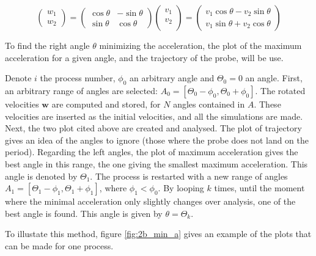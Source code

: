 \documentclass[a4paper,12pt,twoside]{article}
\begin{document}
\begin{equation}
  \begin{pmatrix}
    w_1 \\
    w_2
  \end{pmatrix}
  =
  \begin{pmatrix}
    \cos\theta & -\sin\theta \\
    \sin\theta & \cos\theta
  \end{pmatrix}
  \begin{pmatrix}
    v_1 \\
    v_2 \\
  \end{pmatrix}
  =
  \begin{pmatrix}
    v_1\cos\theta - v_2\sin\theta \\
    v_1\sin\theta + v_2\cos\theta
  \end{pmatrix}
  \label{eq:v_rotation}
\end{equation}

To find the right angle $\theta$ minimizing the acceleration, the plot of the maximum acceleration for a given angle, and the trajectory of the probe, will be use.

Denote $i$ the process number, $\phi_0$ an arbitrary angle and $\Theta_0 = 0$ an angle.
First, an arbitrary range of angles are selected: $A_0 = [\Theta_0-\phi_0, \Theta_0+\phi_0]$.
The rotated velocities $\mathbf{w}$ are computed and stored, for $N$ angles contained in $A$.
These velocities are inserted as the initial velocities, and all the simulations are made.
Next, the two plot cited above are created and analysed.
The plot of trajectory gives an idea of the angles to ignore (those where the probe does not land on the period).
Regarding the left angles, the plot of maximum acceleration gives the best angle in this range, the one giving the smallest maximum acceleration. This angle is denoted by $\Theta_1$.
The process is restarted with a new range of angles $A_1 = [\Theta_1 - \phi_1, \Theta_1 + \phi_1]$, where $\phi_1 < \phi_0$.
By looping $k$ times, until the moment where the minimal acceleration only slightly changes over analysis,  one of the best angle is found.
This angle is given by $\theta = \Theta_k$.

To illustate this method, figure \ref{fig:2b_min_a} gives an example of the plots that can be made for one process.
\end{document}
